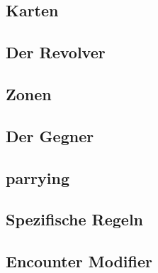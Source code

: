 \subsection{Karten}\label{backpack_and_deck}

\subsection{Der Revolver}\label{backpack_and_deck}


\subsection{Zonen}\label{backpack_and_deck}

\subsection{Der Gegner}\label{backpack_and_deck}

\subsection{parrying}\label{backpack_and_deck}

\subsection{Spezifische Regeln}\label{spezifische_regeln}

\subsection{Encounter Modifier}\label{backpack_and_deck}
%

\renewcommand{\kapitelautor}{}
